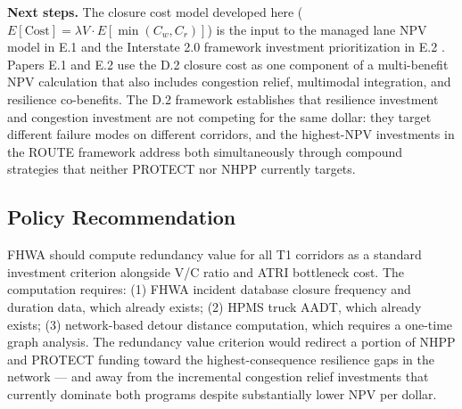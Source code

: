 \textbf{Next steps.} The closure cost model developed here ($E[\text{Cost}] =
\lambda V \cdot E[\min(C_w, C_r)]$) is the input to the managed lane NPV model
in E.1 and the Interstate 2.0 framework investment prioritization in E.2
\citep{ROUTE_D1}. Papers E.1 and E.2 use the D.2 closure cost as one component
of a multi-benefit NPV calculation that also includes congestion relief, multimodal
integration, and resilience co-benefits. The D.2 framework establishes that resilience
investment and congestion investment are not competing for the same dollar: they target
different failure modes on different corridors, and the highest-NPV investments in the
ROUTE framework address both simultaneously through compound strategies that neither
PROTECT nor NHPP currently targets.

\subsection*{Policy Recommendation}

FHWA should compute redundancy value for all T1 corridors as a standard investment
criterion alongside V/C ratio and ATRI bottleneck cost. The computation requires:
(1) FHWA incident database closure frequency and duration data, which already exists;
(2) HPMS truck AADT, which already exists; (3) network-based detour distance
computation, which requires a one-time graph analysis. The redundancy value criterion
would redirect a portion of NHPP and PROTECT funding toward the highest-consequence
resilience gaps in the network --- and away from the incremental congestion relief
investments that currently dominate both programs despite substantially lower NPV
per dollar.
